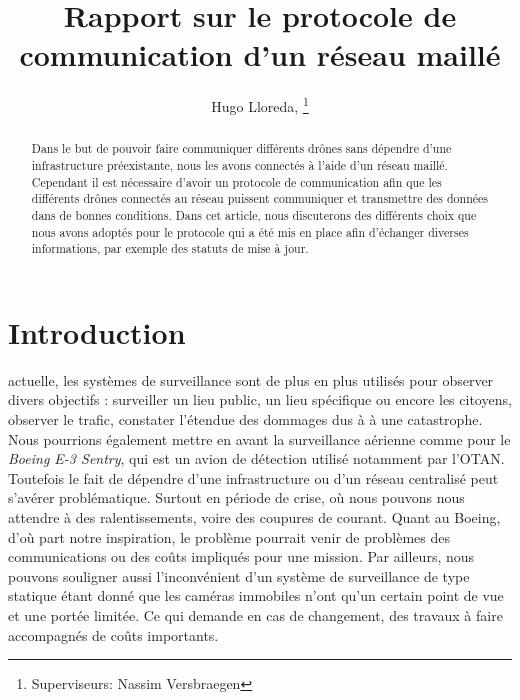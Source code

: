 \documentclass[journal, a4paper]{IEEEtran}
\begin{document}
	\title{Rapport sur le protocole de communication d'un réseau maillé}
	\author{Hugo Lloreda,
	\thanks{Superviseurs: Nassim Versbraegen}}
	\maketitle

\begin{abstract}
        Dans le but de pouvoir faire communiquer différents drônes sans dépendre d'une infrastructure préexistante, nous les avons connectés à l'aide d'un réseau maillé.
        Cependant il est nécessaire d'avoir un protocole de communication afin que les différents drônes connectés au réseau puissent communiquer et transmettre des données dans de bonnes conditions.
        Dans cet article, nous discuterons des différents choix que nous avons adoptés pour le protocole qui a été mis en place afin d’échanger diverses informations, par exemple des statuts de mise à jour.
\end{abstract}

\section{Introduction}
         actuelle, les systèmes de surveillance sont de plus en plus utilisés pour observer divers objectifs : surveiller un lieu public, un lieu spécifique ou encore les citoyens, 
        observer le trafic, constater l'étendue des dommages dus à à une catastrophe.
        Nous pourrions également mettre en avant la surveillance aérienne comme pour le \textit{Boeing E-3 Sentry}, qui est un avion de détection utilisé notamment par l'OTAN. \\

        Toutefois le fait de dépendre d'une infrastructure ou d'un réseau centralisé peut s'avérer problématique. Surtout en période de crise, où nous pouvons nous
        attendre à des ralentissements, voire des coupures de courant. Quant au Boeing, d'où part notre inspiration, le problème pourrait venir de problèmes des communications ou des coûts impliqués pour une mission. 
        Par ailleurs, nous pouvons souligner aussi l'inconvénient d'un système de surveillance de type statique étant donné que les caméras immobiles n'ont qu'un certain point de vue et une portée limitée. 
        Ce qui demande en cas de changement, des travaux à faire accompagnés de coûts importants.
\end{document}
